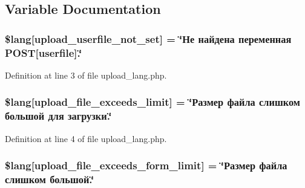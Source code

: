 \subsection{Variable Documentation}
\subsubsection[{\texorpdfstring{\$lang}{$lang}}]{\setlength{\rightskip}{0pt plus 5cm}\$lang\mbox{[}\textquotesingle{}upload\+\_\+userfile\+\_\+not\+\_\+set\textquotesingle{}\mbox{]} = \char`\"{}Не найдена переменная P\+O\+ST\mbox{[}userfile\mbox{]}.\char`\"{}}\hypertarget{application_2language_2russian_2upload__lang_8php_a6d12ff4074b1e4c6f22a4a5107fae5ee}{}\label{application_2language_2russian_2upload__lang_8php_a6d12ff4074b1e4c6f22a4a5107fae5ee}


Definition at line 3 of file upload\+\_\+lang.\+php.

\subsubsection[{\texorpdfstring{\$lang}{$lang}}]{\setlength{\rightskip}{0pt plus 5cm}\$lang\mbox{[}\textquotesingle{}upload\+\_\+file\+\_\+exceeds\+\_\+limit\textquotesingle{}\mbox{]} = \char`\"{}Размер файла слишком большой для загрузки.\char`\"{}}\hypertarget{application_2language_2russian_2upload__lang_8php_a9028f049ebbe292a27e0e2b2e5f7d660}{}\label{application_2language_2russian_2upload__lang_8php_a9028f049ebbe292a27e0e2b2e5f7d660}


Definition at line 4 of file upload\+\_\+lang.\+php.

\subsubsection[{\texorpdfstring{\$lang}{$lang}}]{\setlength{\rightskip}{0pt plus 5cm}\$lang\mbox{[}\textquotesingle{}upload\+\_\+file\+\_\+exceeds\+\_\+form\+\_\+limit\textquotesingle{}\mbox{]} = \char`\"{}Размер файла слишком большой.\char`\"{}}\hypertarget{application_2language_2russian_2upload__lang_8php_af6f65d563af150d50dfc6957079fd529}{}\label{application_2language_2russian_2upload__lang_8php_af6f65d563af150d50dfc6957079fd529}



